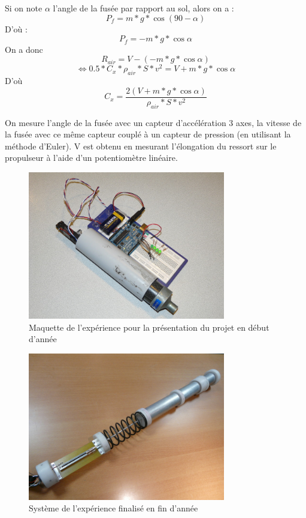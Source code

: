 \documentclass[a4paper,12pt]{scrartcl}
\begin{document}
		Si on note $\alpha$ l'angle de la fusée par rapport au sol, alors on a : 
		  $$ P_f = m * g * \cos{(90-\alpha)}$$
		D'où : 
		  $$ P_f = - m * g * \cos{\alpha}$$		
		On a donc 
		  $$ R_{air} = V - (- m * g * \cos{\alpha})$$
		  $$ \Leftrightarrow 0.5 * C_x * \rho_{air} * S * v^2 = V + m * g * \cos{\alpha} $$
		D'où
		  $$ C_x = \frac{2(V + m * g * \cos{\alpha})}{\rho_{air} * S * v^2} $$
		
		On mesure l'angle de la fusée avec un capteur d'accélération 3 axes, la vitesse de la fusée avec ce même capteur couplé à un capteur de pression (en utilisant la méthode d'Euler).
		V est obtenu en mesurant l'élongation du ressort sur le propulseur à l'aide d'un potentiomètre linéaire.
		\begin{figure}[H]
		    \begin{center}
			\caption{ Maquette de l'expérience pour la présentation du projet en début d'année}
			\includegraphics[height=244px, width=326px]{Photos_Mercury/maquette_systeme_ressort.jpg}
		     \end{center}
		\end{figure}
		\begin{figure}[H]
		    \begin{center}
			\caption{ Système de l'expérience finalisé en fin d'année }
			\includegraphics[height=244px, width=326px]{Photos_Mercury/systemeressort.jpg}
		     \end{center}
		\end{figure}
\end{document}
